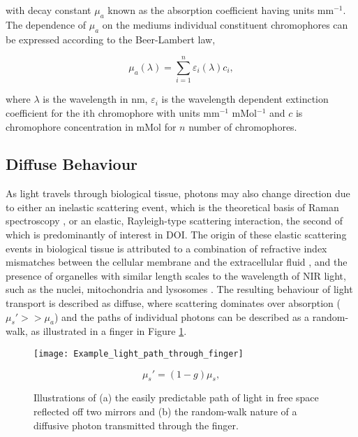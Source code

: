 \documentclass[twoside]{bhamthesis}
\theoremstyle{definition}
\begin{document}
with decay constant $\mu_a$ known as the absorption coefficient having units $\mathrm{mm^{-1}}$. The dependence of $\mu_a$ on the mediums individual constituent chromophores can be expressed according to the Beer-Lambert law,

\begin{equation}
\mu _a (\lambda) = \sum_{i=1}^n \varepsilon_i (\lambda) c_i ,
  \label{eqn:RTE}
\end{equation}

where $\lambda$ is the wavelength in nm, $\varepsilon_i$ is the wavelength dependent extinction coefficient for the ith chromophore with units mm$^{-1}$ mMol$^{-1}$ and $c$ is chromophore concentration in mMol for $n$ number of chromophores. 

\subsection{Diffuse Behaviour}

As light travels through biological tissue, photons may also change direction due to either an inelastic scattering event, which is the theoretical basis of Raman spectroscopy \cite{long1977raman}, or an elastic, Rayleigh-type scattering interaction, the second of which is predominantly of interest in DOI. The origin of these elastic scattering events in biological tissue is attributed to a combination of refractive index mismatches between the cellular membrane and the extracellular fluid \cite{mourant2000light}, and the presence of organelles with similar length scales to the wavelength of NIR light, such as the nuclei, mitochondria and lysosomes \cite{mourant2000light,beauvoit1994contribution,marina2012correlating}. The resulting behaviour of light transport is described as diffuse, where scattering dominates over absorption ($\mu_s' >> \mu_a$)  and the paths of individual photons can be described as a random-walk, as illustrated in a finger in Figure \ref{fig:Random_walk}.

\begin{figure}[!ht]
	\begin{minipage}{.7\textwidth}
    \centering
    \texttt{[image: Example\_light\_path\_through\_finger]}
    \caption{Illustrations of (a) the easily predictable path of light in free space reflected off two mirrors and (b) the random-walk nature of a diffusive photon transmitted through the finger.} 
    \label{fig:Random_walk}
  \end{minipage}%
  \begin{minipage}{.3\textwidth}
     \begin{equation}
\mu_s' = (1-g)\mu_s,
  \label{eqn:reduced_scatter}
    \end{equation}
  \end{minipage}
\end{figure}
\end{document}
